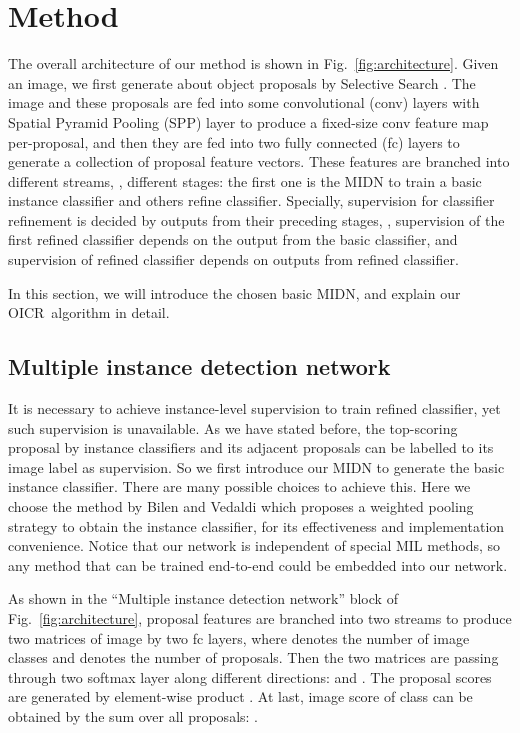 \documentclass[10pt,twocolumn,letterpaper]{article}
\def\methodname{OICR}
\begin{document}
\section{Method}
\label{sec:method}

The overall architecture of our method is shown in Fig.~\ref{fig:architecture}.
Given an image, we first generate about  object proposals by Selective Search \cite{Ref:Uijlings2013}.
The image and these proposals are fed into some convolutional (conv) layers with Spatial Pyramid Pooling (SPP) layer \cite{Ref:He2015} to produce a fixed-size conv feature map per-proposal,
and then they are fed into two fully connected (fc) layers to generate a collection of proposal feature vectors.
These features are branched into different streams, \ie, different stages: the first one is the MIDN to train a basic instance classifier and others refine classifier.
Specially, supervision for classifier refinement is decided by outputs from their preceding stages, \eg, supervision of the first refined classifier depends on the output from the basic classifier, and supervision of  refined classifier depends on outputs from  refined classifier.

In this section, we will introduce the chosen basic MIDN, and explain our \methodname\ algorithm in detail.


\subsection{Multiple instance detection network}
\label{sec:midn}

It is necessary to achieve instance-level supervision to train refined classifier, yet such supervision is unavailable.
As we have stated before, the top-scoring proposal by instance classifiers and its adjacent proposals can be labelled to its image label as supervision.
So we first introduce our MIDN to generate the basic instance classifier.
There are many possible choices \cite{Ref:Bilen2016,Ref:Cibis2017,Ref:Kantorov2016,Ref:Wang2015} to achieve this.
Here we choose the method by Bilen and Vedaldi \cite{Ref:Bilen2016} which proposes a weighted pooling strategy to obtain the instance classifier, for its effectiveness and implementation convenience.
Notice that our network is independent of special MIL methods, so any method that can be trained end-to-end could be embedded into our network.

As shown in the ``Multiple instance detection network'' block of Fig.~\ref{fig:architecture}, proposal features are branched into two streams to produce two matrices  of image by two fc layers, where  denotes the number of image classes and  denotes the number of proposals.
Then the two matrices are passing through two softmax layer along different directions:
 and .
The proposal scores are generated by element-wise product .
At last, image score of  class  can be obtained by the sum over all proposals: .
\end{document}
